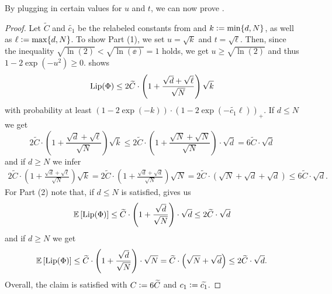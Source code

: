 By plugging in certain values for $u$ and $t$, we can now prove .
\renewcommand*{\proofname}{Proof of \Cref{thm:main_1}}
\begin{proof}
Let $\widetilde{C}$ and $\widetilde{c_1}$ be the relabeled constants from  and $k \mathrel{\mathop:}= \min\{d,N\}$, as well as $\ell \mathrel{\mathop:}= \max\{d,N\}$. To show Part (1), we set $u = \sqrt{k}$ and $t = \sqrt{\ell}$. Then, since the inequality $\sqrt{\ln(2)} < \sqrt{\ln(\ee)} = 1$ holds, we get $u \geq \sqrt{\ln(2)}$ and thus $1-2\exp(-u^2) \geq 0$.  shows 
\begin{equation*}
\operatorname{Lip}(\Phi) \leq 2\widetilde{C} \cdot \left(1 + \frac{\sqrt{d} +\sqrt{\ell}}{\sqrt{N}}\right) \sqrt{k} 
\end{equation*}
with probability at least $(1-2\exp(-k)) \cdot (1-2\exp(-\widetilde{c_1} \ell))_+$. If $d \leq N$ we get
\begin{equation*}
2\widetilde{C}\cdot \left(1 + \frac{\sqrt{d} +\sqrt{\ell}}{\sqrt{N}}\right) \sqrt{k} \leq 2\widetilde{C}\cdot  \left(1 + \frac{\sqrt{N} + \sqrt{N}}{\sqrt{N}}\right) \cdot \sqrt{d} = 6\widetilde{C} \cdot \sqrt{d}
\end{equation*}
and if $d \geq N$ we infer
\begin{align*}
2\widetilde{C}\cdot \left(1 + \frac{\sqrt{d} +\sqrt{\ell}}{\sqrt{N}}\right) \sqrt{k} = 2\widetilde{C}\cdot \left(1 + \frac{\sqrt{d} +\sqrt{d}}{\sqrt{N}}\right) \sqrt{N}= 2\widetilde{C}\cdot \left(\sqrt{N} + \sqrt{d} + \sqrt{d}\right) \leq 6\widetilde{C} \cdot \sqrt{d}.
\end{align*}
For Part (2) note that, if $d \leq N$ is satisfied,  gives us
\begin{equation*}
\mathbb{E} \left[\operatorname{Lip}(\Phi) \right]  \leq \widetilde{C}\cdot \left(1+ \frac{\sqrt{d} }{\sqrt{N}} \right) \cdot \sqrt{d} \leq 2 \widetilde{C} \cdot \sqrt{d}
\end{equation*}
and if $d \geq N$ we get
\begin{equation*}
\mathbb{E} \left[\operatorname{Lip}(\Phi) \right]  \leq \widetilde{C} \cdot\left(1+ \frac{\sqrt{d} }{\sqrt{N}} \right) \cdot \sqrt{N} = \widetilde{C}\cdot \left(\sqrt{N} + \sqrt{d}\right) \leq 2 \widetilde{C}\cdot \sqrt{d}.
\end{equation*}
Overall, the claim is satisfied with $C \mathrel{\mathop:}=  6\widetilde{C}$ and $c_1 \mathrel{\mathop:}= \widetilde{c_1}$.
\end{proof}
\renewcommand*{\proofname}{Proof}

